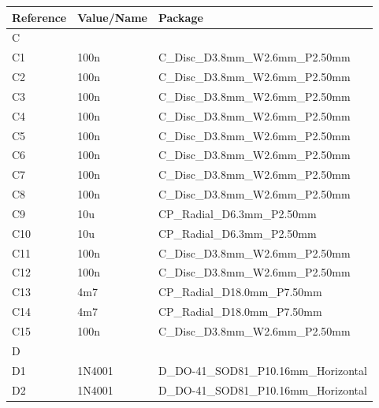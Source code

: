 \documentclass[paper=a4, open=any, numbers=noenddot]{scrbook}
\begin{document}
				\begin{longtabu}
					to \textwidth[l]{lX[-1]X}
					Reference & Value/Name             & Package                                                 \\ \hline\hline
					\endhead
					C         &                        &                                                         \\*
					C1        & 100n                   & C\_Disc\_D3.8mm\_W2.6mm\_P2.50mm                        \\
					C2        & 100n                   & C\_Disc\_D3.8mm\_W2.6mm\_P2.50mm                        \\
					C3        & 100n                   & C\_Disc\_D3.8mm\_W2.6mm\_P2.50mm                        \\
					C4        & 100n                   & C\_Disc\_D3.8mm\_W2.6mm\_P2.50mm                        \\
					C5        & 100n                   & C\_Disc\_D3.8mm\_W2.6mm\_P2.50mm                        \\
					C6        & 100n                   & C\_Disc\_D3.8mm\_W2.6mm\_P2.50mm                        \\
					C7        & 100n                   & C\_Disc\_D3.8mm\_W2.6mm\_P2.50mm                        \\
					C8        & 100n                   & C\_Disc\_D3.8mm\_W2.6mm\_P2.50mm                        \\
					C9        & 10u                    & CP\_Radial\_D6.3mm\_P2.50mm                             \\
					C10       & 10u                    & CP\_Radial\_D6.3mm\_P2.50mm                             \\
					C11       & 100n                   & C\_Disc\_D3.8mm\_W2.6mm\_P2.50mm                        \\
					C12       & 100n                   & C\_Disc\_D3.8mm\_W2.6mm\_P2.50mm                        \\
					C13       & 4m7                    & CP\_Radial\_D18.0mm\_P7.50mm                            \\
					C14       & 4m7                    & CP\_Radial\_D18.0mm\_P7.50mm                            \\
					C15       & 100n                   & C\_Disc\_D3.8mm\_W2.6mm\_P2.50mm                        \\
					\hline

					D         &                        &                                                         \\*
					D1        & 1N4001                 & D\_DO-41\_SOD81\_P10.16mm\_Horizontal                   \\
					D2        & 1N4001                 & D\_DO-41\_SOD81\_P10.16mm\_Horizontal                   \\
					\hline


\end{longtabu}
\end{document}
